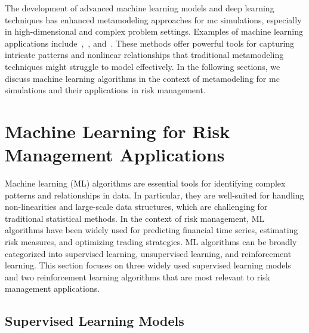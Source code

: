 The development of advanced machine learning models and deep learning techniques has enhanced metamodeling approaches for \gls{mc} simulations, especially in high-dimensional and complex problem settings.
Examples of machine learning applications include~\cite{jin2020deep},~\cite{tang2020deep}, and~\cite{rosen2012metamodeling}.
These methods offer powerful tools for capturing intricate patterns and nonlinear relationships that traditional metamodeling techniques might struggle to model effectively.
In the following sections, we discuss machine learning algorithms in the context of metamodeling for \gls{mc} simulations and their applications in risk management.

\section{Machine Learning for Risk Management Applications}

Machine learning (ML) algorithms are essential tools for identifying complex patterns and relationships in data.
In particular, they are well-suited for handling non-linearities and large-scale data structures, which are challenging for traditional statistical methods.
In the context of risk management, ML algorithms have been widely used for predicting financial time series, estimating risk measures, and optimizing trading strategies.
ML algorithms can be broadly categorized into supervised learning, unsupervised learning, and reinforcement learning.
This section focuses on three widely used supervised learning models and two reinforcement learning algorithms that are most relevant to risk management applications.

\subsection{Supervised Learning Models}

